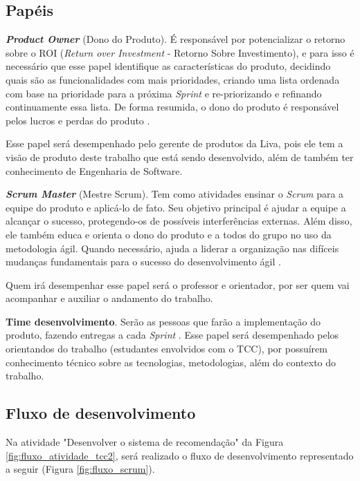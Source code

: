 \subsection{Papéis}

\textbf{\textit{Product Owner}} (Dono do Produto). É responsável por potencializar o retorno sobre o ROI (\textit{Return over Investment} - Retorno Sobre Investimento), e para isso é necessário que esse papel identifique as características do produto, decidindo quais são as funcionalidades com mais prioridades, criando uma lista ordenada com base na prioridade para a próxima \textit{Sprint} e re-priorizando e refinando continuamente essa lista. De forma resumida, o dono do produto é responsável pelos lucros e perdas do produto \cite{Sutherland}.

Esse papel será desempenhado pelo gerente de produtos da Liva, pois ele tem a visão de produto deste trabalho que está sendo desenvolvido, além de também ter conhecimento de Engenharia de Software.

\textbf{\textit{Scrum Master}} (Mestre Scrum). Tem como atividades ensinar o \textit{Scrum} para a equipe do produto e aplicá-lo de fato. Seu objetivo principal é ajudar a equipe a alcançar o sucesso, protegendo-os de possíveis interferências externas. Além disso, ele também educa e  orienta o dono do produto e a todos do grupo no uso da metodologia ágil. Quando necessário, ajuda a liderar a organização nas difíceis mudanças fundamentais para o sucesso do desenvolvimento ágil \cite{Sutherland}.

Quem irá desempenhar esse papel será o professor e orientador, por ser quem vai acompanhar e auxiliar o andamento do trabalho.

\textbf{Time desenvolvimento}. Serão as pessoas que farão a implementação do produto, fazendo entregas a cada \textit{Sprint} \cite{Sutherland}. Esse papel será desempenhado pelos orientandos do trabalho (estudantes envolvidos com o TCC), por possuírem conhecimento técnico sobre as tecnologias, metodologias, além do contexto do trabalho.

\subsection{Fluxo de desenvolvimento}

Na atividade "Desenvolver o sistema de recomendação" da Figura \ref{fig:fluxo_atividade_tcc2}, será realizado o fluxo de desenvolvimento representado a seguir (Figura \ref{fig:fluxo_scrum}).


